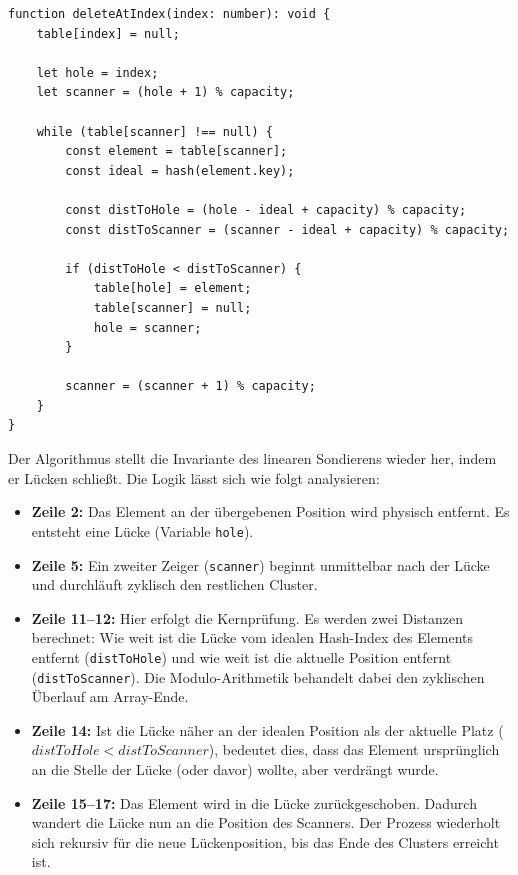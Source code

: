 \begin{listing}[H]
	\caption{Algorithmus zur Rückverschiebung (Backshift Deletion), adaptiert nach \autocite[S. 302]{cormen2022introduction}}
	\label{lst:backshift_algo}
	\begin{verbatim}
function deleteAtIndex(index: number): void {
	table[index] = null;
	
	let hole = index;
	let scanner = (hole + 1) % capacity;
	
	while (table[scanner] !== null) {
		const element = table[scanner];
		const ideal = hash(element.key);
		
		const distToHole = (hole - ideal + capacity) % capacity;
		const distToScanner = (scanner - ideal + capacity) % capacity;
		
		if (distToHole < distToScanner) {
			table[hole] = element;
			table[scanner] = null;
			hole = scanner;
		}
		
		scanner = (scanner + 1) % capacity;
	}
}
	\end{verbatim}
\end{listing}

Der Algorithmus stellt die Invariante des linearen Sondierens wieder her, indem er Lücken schließt. Die Logik lässt sich wie folgt analysieren:

\begin{itemize}
	\item \textbf{Zeile 2:} Das Element an der übergebenen Position wird physisch entfernt. Es entsteht eine Lücke (Variable \texttt{hole}).
	\item \textbf{Zeile 5:} Ein zweiter Zeiger (\texttt{scanner}) beginnt unmittelbar nach der Lücke und durchläuft zyklisch den restlichen Cluster.
	\item \textbf{Zeile 11--12:} Hier erfolgt die Kernprüfung. Es werden zwei Distanzen berechnet: Wie weit ist die Lücke vom idealen Hash-Index des Elements entfernt (\texttt{distToHole}) und wie weit ist die aktuelle Position entfernt (\texttt{distToScanner}). Die Modulo-Arithmetik behandelt dabei den zyklischen Überlauf am Array-Ende.
	\item \textbf{Zeile 14:} Ist die Lücke näher an der idealen Position als der aktuelle Platz ($distToHole < distToScanner$), bedeutet dies, dass das Element ursprünglich an die Stelle der Lücke (oder davor) wollte, aber verdrängt wurde.
	\item \textbf{Zeile 15--17:} Das Element wird in die Lücke zurückgeschoben. Dadurch wandert die Lücke nun an die Position des Scanners. Der Prozess wiederholt sich rekursiv für die neue Lückenposition, bis das Ende des Clusters erreicht ist.
\end{itemize}

